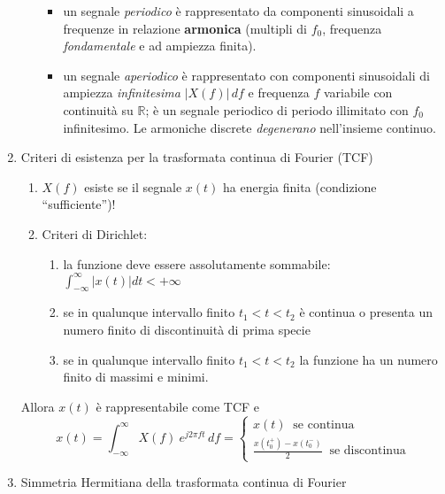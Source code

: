 \documentclass[
]{article}
\providecommand{\tightlist}{%
  \setlength{\itemsep}{0pt}\setlength{\parskip}{0pt}}
\begin{document}
\begin{enumerate}
\begin{itemize}
    \begin{itemize}
    \tightlist
    \item
      un segnale \emph{periodico} è rappresentato da componenti
      sinusoidali a frequenze in relazione \textbf{armonica} (multipli
      di \(f_0\), frequenza \emph{fondamentale} e ad ampiezza finita).
    \item
      un segnale \emph{aperiodico} è rappresentato con componenti
      sinusoidali di ampiezza \emph{infinitesima} \(|X(f)|\,df\) e
      frequenza \(f\) variabile con continuità su \(\mathbb{R}\); è un
      segnale periodico di periodo illimitato con \(f_0\) infinitesimo.
      Le armoniche discrete \emph{degenerano} nell'insieme continuo.
    \end{itemize}
  \end{itemize}
\item
  Criteri di esistenza per la trasformata continua di Fourier (TCF)

  \begin{enumerate}
  \def\labelenumii{\arabic{enumii}.}
  \tightlist
  \item
    \(X(f)\) esiste se il segnale \(x(t)\) ha energia finita (condizione
    ``sufficiente'')!
  \item
    Criteri di Dirichlet:

    \begin{enumerate}
    \def\labelenumiii{\arabic{enumiii}.}
    \tightlist
    \item
      la funzione deve essere assolutamente sommabile:
      \(\displaystyle \int_{-\infty}^{\infty} |x(t)| dt < +\infty\)
    \item
      se in qualunque intervallo finito \(t_1 < t < t_2\) è continua o
      presenta un numero finito di discontinuità di prima specie
    \item
      se in qualunque intervallo finito \(t_1 < t < t_2\) la funzione ha
      un numero finito di massimi e minimi.
    \end{enumerate}
  \end{enumerate}

  Allora \(x(t)\) è rappresentabile come TCF e \[
  x(t) = \int_{-\infty}^{\infty}X(f)\ e^{j2\pi ft} \,df =  \left\{ \begin{array}{cl}
  x(t) \ \text{ se continua}  \\
  \frac{x(t_{0}^{+})-x(t_{0}^{-})}{2}\ \text{ se discontinua}
  \end{array} \right.
  \]
\item
  Simmetria Hermitiana della trasformata continua di Fourier


\end{enumerate}
\end{document}
